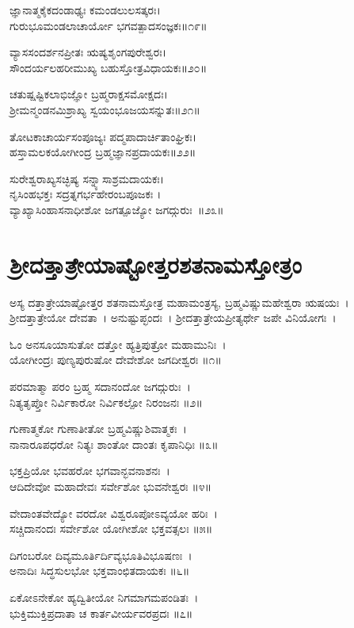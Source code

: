 ಜ್ಞಾನಾತ್ಮಕೈಕದಂಡಾಢ್ಯಃ ಕಮಂಡಲುಲಸತ್ಕರಃ।\\
ಗುರುಭೂಮಂಡಲಾಚಾರ್ಯೋ ಭಗವತ್ಪಾದಸಂಜ್ಞಕಃ॥೧೯॥

ವ್ಯಾಸಸಂದರ್ಶನಪ್ರೀತಃ ಋಷ್ಯಶೃಂಗಪುರೇಶ್ವರಃ।\\
ಸೌಂದರ್ಯಲಹರೀಮುಖ್ಯ ಬಹುಸ್ತೋತ್ರವಿಧಾಯಕಃ॥೨೦॥

ಚತುಷ್ಷಷ್ಟಿಕಲಾಭಿಜ್ಞೋ ಬ್ರಹ್ಮರಾಕ್ಷಸಮೋಕ್ಷದಃ।\\
 ಶ್ರೀಮನ್ಮಂಡನಮಿಶ್ರಾಖ್ಯ ಸ್ವಯಂಭೂಜಯಸನ್ನುತಃ॥೨೧॥

 ತೋಟಕಾಚಾರ್ಯಸಂಪೂಜ್ಯಃ  ಪದ್ಮಪಾದಾರ್ಚಿತಾಂಘ್ರಿಕಃ।\\
 ಹಸ್ತಾಮಲಕಯೋಗೀಂದ್ರ ಬ್ರಹ್ಮಜ್ಞಾನಪ್ರದಾಯಕಃ॥೨೨॥

 ಸುರೇಶ್ವರಾಖ್ಯಸಚ್ಛಿಷ್ಯ ಸನ್ನ್ಯಾಸಾಶ್ರಮದಾಯಕಃ।\\
 ನೃಸಿಂಹಭಕ್ತಃ  ಸದ್ರತ್ನಗರ್ಭಹೇರಂಬಪೂಜಕಃ ।\\
 ವ್ಯಾಖ್ಯಾಸಿಂಹಾಸನಾಧೀಶೋ ಜಗತ್ಪೂಜ್ಯೋ ಜಗದ್ಗುರುಃ~॥೨೩॥

\section{ಶ್ರೀದತ್ತಾತ್ರೇಯಾಷ್ಟೋತ್ತರಶತನಾಮಸ್ತೋತ್ರಂ}
ಅಸ್ಯ ದತ್ತಾತ್ರೇಯಾಷ್ಟೋತ್ತರ ಶತನಾಮಸ್ತೋತ್ರ ಮಹಾಮಂತ್ರಸ್ಯ, ಬ್ರಹ್ಮವಿಷ್ಣುಮಹೇಶ್ವರಾ ಋಷಯಃ~। ಶ್ರೀದತ್ತಾತ್ರೇಯೋ ದೇವತಾ~। ಅನುಷ್ಟುಪ್ಛಂದಃ~। ಶ್ರೀದತ್ತಾತ್ರೇಯಪ್ರೀತ್ಯರ್ಥೇ ಜಪೇ ವಿನಿಯೋಗಃ~।\\

ಓಂ ಅನಸೂಯಾಸುತೋ ದತ್ತೋ ಹ್ಯತ್ರಿಪುತ್ರೋ ಮಹಾಮುನಿಃ~।\\
ಯೋಗೀಂದ್ರಃ ಪುಣ್ಯಪುರುಷೋ ದೇವೇಶೋ ಜಗದೀಶ್ವರಃ ॥೧॥

ಪರಮಾತ್ಮಾ ಪರಂ ಬ್ರಹ್ಮ ಸದಾನಂದೋ ಜಗದ್ಗುರುಃ~।\\
ನಿತ್ಯತೃಪ್ತೋ ನಿರ್ವಿಕಾರೋ ನಿರ್ವಿಕಲ್ಪೋ ನಿರಂಜನಃ ॥೨॥

ಗುಣಾತ್ಮಕೋ ಗುಣಾತೀತೋ ಬ್ರಹ್ಮವಿಷ್ಣುಶಿವಾತ್ಮಕಃ~।\\
ನಾನಾರೂಪಧರೋ ನಿತ್ಯಃ ಶಾಂತೋ ದಾಂತಃ ಕೃಪಾನಿಧಿಃ ॥೩॥

ಭಕ್ತಪ್ರಿಯೋ ಭವಹರೋ ಭಗವಾನ್ಭವನಾಶನಃ~।\\
ಆದಿದೇವೋ ಮಹಾದೇವಃ ಸರ್ವೇಶೋ ಭುವನೇಶ್ವರಃ ॥೪॥

ವೇದಾಂತವೇದ್ಯೋ ವರದೋ ವಿಶ್ವರೂಪೋಽವ್ಯಯೋ ಹರಿಃ~।\\
ಸಚ್ಚಿದಾನಂದಃ ಸರ್ವೇಶೋ ಯೋಗೀಶೋ ಭಕ್ತವತ್ಸಲಃ ॥೫॥

ದಿಗಂಬರೋ ದಿವ್ಯಮೂರ್ತಿರ್ದಿವ್ಯಭೂತಿವಿಭೂಷಣಃ~।\\
ಅನಾದಿಃ ಸಿದ್ಧಸುಲಭೋ ಭಕ್ತವಾಂಛಿತದಾಯಕಃ ॥೬॥

ಏಕೋಽನೇಕೋ ಹ್ಯದ್ವಿತೀಯೋ ನಿಗಮಾಗಮಪಂಡಿತಃ~।\\
ಭುಕ್ತಿಮುಕ್ತಿಪ್ರದಾತಾ ಚ ಕಾರ್ತವೀರ್ಯವರಪ್ರದಃ ॥೭॥

